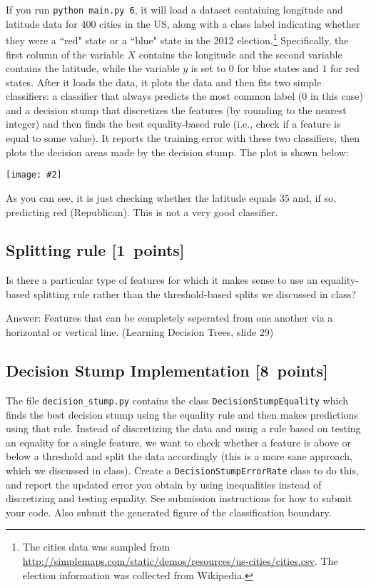 \documentclass{article}
\newcommand{\blu}[1]{{\textcolor{blu}{#1}}}
\newenvironment{answer}{\par\begingroup\color{gre}Answer: }{\endgroup}
\let\ask\blu
\newcommand\pts[1]{\textcolor{pointscolour}{[#1~points]}}
\newcommand{\centerfig}[2]{\begin{center}\texttt{[image: \#2]}\end{center}}
\begin{document}
  If you run \texttt{python main.py 6}, it will load a dataset containing longitude
  and latitude data for 400 cities in the US, along with a class label indicating
  whether they were a ``red" state or a ``blue" state in the 2012
  election.\footnote{The cities data was sampled from \url{http://simplemaps.com/static/demos/resources/us-cities/cities.csv}. The election information was collected from Wikipedia.}
  Specifically, the first column of the variable $X$ contains the
  longitude and the second variable contains the latitude,
  while the variable $y$ is set to $0$ for blue states and $1$ for red states.
  After it loads the data, it plots the data and then fits two simple
  classifiers: a classifier that always predicts the
  most common label ($0$ in this case) and a decision stump
  that discretizes the features (by rounding to the nearest integer)
  and then finds the best equality-based rule (i.e., check
  if a feature is equal to some value).
  It reports the training error with these two classifiers, then plots the decision areas made by the decision stump.
  The plot is shown below:

  \centerfig{0.7}{./figs/q6_decisionBoundary}

  As you can see, it is just checking whether the latitude equals 35 and, if so, predicting red (Republican).
  This is not a very good classifier.

  \subsection{Splitting rule \pts{1}}

  Is there a particular type of features for which it makes sense to use an equality-based splitting rule rather than the threshold-based splits we discussed in class?

  \begin{answer}
  Features that can be completely seperated from one another via a horizontal or vertical line. (Learning Decision Trees, slide 29)
  \end{answer}

  \subsection{Decision Stump Implementation \pts{8}}

  The file \texttt{decision\string_stump.py} contains the class \texttt{DecisionStumpEquality} which
  finds the best decision stump using the equality rule and then makes predictions using that
  rule. Instead of discretizing the data and using a rule based on testing an equality for
  a single feature, we want to check whether a feature is above or below a threshold and
  split the data accordingly (this is a more sane approach, which we discussed in class).
  \ask{Create a \texttt{DecisionStumpErrorRate} class to do this, and report the updated error you
  obtain by using inequalities instead of discretizing and testing equality.
  See submission instructions for how to submit your code.
  Also submit the generated figure of the classification boundary.}
\end{document}
